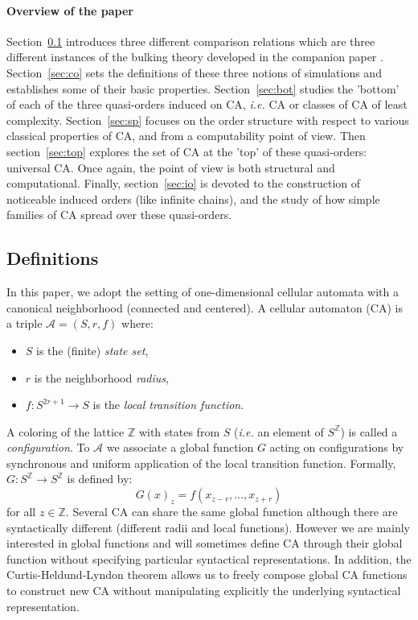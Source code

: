 \documentclass[a4paper]{elsarticle}
\newcommand{\ZZ}{\mathbb{Z}}
\newcommand{\ACA}{\mathcal{A}}
\begin{document}
\paragraph{Overview of the paper} Section~\ref{sec:def} introduces
three different comparison relations which are three different
instances of the bulking theory developed in the companion paper
\cite{bulking1}.  Section~\ref{sec:co} sets the definitions of these
three notions of simulations and establishes some of their basic
properties. Section~\ref{sec:bot} studies the 'bottom' of each of the
three quasi-orders induced on CA, \textit{i.e.} CA or classes of CA of
least complexity. Section~\ref{sec:sp} focuses on the order structure
with respect to various classical properties of CA, and from a
computability point of view. Then section~\ref{sec:top} explores the
set of CA at the 'top' of these quasi-orders: universal CA. Once
again, the point of view is both structural and computational.
Finally, section~\ref{sec:io} is devoted to the construction of
noticeable induced orders (like infinite chains), and the study of how
simple families of CA spread over these quasi-orders.


\subsection{Definitions}
\label{sec:def}

In this paper, we adopt the setting of one-dimensional cellular
automata with a canonical neighborhood (connected and centered).  A
cellular automaton (CA) is a triple ${\ACA=(S, r, f)}$ where:
\begin{itemize}
\item $S$ is the (finite) \emph{state set},
\item $r$ is the neighborhood \emph{radius},
\item $f:S^{2r+1}\rightarrow S$ is the \emph{local transition function}.
\end{itemize}

A coloring of the lattice $\ZZ$ with states from $S$
(\textit{i.e.}  an element of $S^\ZZ$) is called a
\emph{configuration}.  To $\ACA$ we associate a global function
$G$ acting on configurations by synchronous and uniform
application of the local transition function.  Formally, $G:
S^\ZZ\rightarrow S^\ZZ$ is defined by:
\[G(x)_z = f(x_{z-r},\ldots,x_{z+r})\] for all ${z\in\ZZ}$.  Several
CA can share the same global function although there are syntactically
different (different radii and local functions). However we are mainly
interested in global functions and will sometimes define CA through
their global function without specifying particular syntactical
representations. In addition, the Curtis-Heldund-Lyndon theorem
\cite{Hedlund:1969} allows us to freely compose global CA functions to
construct new CA without manipulating explicitly the underlying
syntactical representation.
\end{document}
